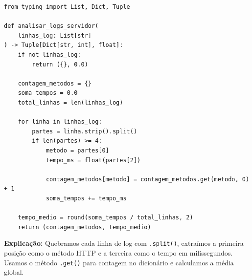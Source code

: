 \ifmostrarGabarito
\begin{verbatim}
from typing import List, Dict, Tuple

def analisar_logs_servidor(
    linhas_log: List[str]
) -> Tuple[Dict[str, int], float]:
    if not linhas_log:
        return ({}, 0.0)
        
    contagem_metodos = {}
    soma_tempos = 0.0
    total_linhas = len(linhas_log)
    
    for linha in linhas_log:
        partes = linha.strip().split()
        if len(partes) >= 4:
            metodo = partes[0]
            tempo_ms = float(partes[2])
            
            contagem_metodos[metodo] = contagem_metodos.get(metodo, 0) + 1
            soma_tempos += tempo_ms
            
    tempo_medio = round(soma_tempos / total_linhas, 2)
    return (contagem_metodos, tempo_medio)
\end{verbatim}

\textbf{Explicação:}
Quebramos cada linha de log com \texttt{.split()}, extraímos a primeira posição como o método HTTP e a terceira como o tempo em milissegundos. Usamos o método \texttt{.get()} para contagem no dicionário e calculamos a média global.
\else
{}
\clearpage
{}
\clearpage
\fi
